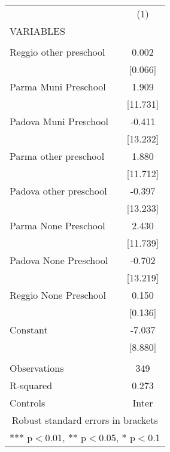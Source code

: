 \begin{tabular}{lc} \hline
 & (1) \\
VARIABLES &  \\ \hline
 &  \\
Reggio other preschool & 0.002 \\
 & [0.066] \\
Parma Muni Preschool & 1.909 \\
 & [11.731] \\
Padova Muni Preschool & -0.411 \\
 & [13.232] \\
Parma other preschool & 1.880 \\
 & [11.712] \\
Padova other preschool & -0.397 \\
 & [13.233] \\
Parma None Preschool & 2.430 \\
 & [11.739] \\
Padova None Preschool & -0.702 \\
 & [13.219] \\
Reggio None Preschool & 0.150 \\
 & [0.136] \\
Constant & -7.037 \\
 & [8.880] \\
 &  \\
Observations & 349 \\
R-squared & 0.273 \\
 Controls & Inter \\ \hline
\multicolumn{2}{c}{ Robust standard errors in brackets} \\
\multicolumn{2}{c}{ *** p$<$0.01, ** p$<$0.05, * p$<$0.1} \\
\end{tabular}
